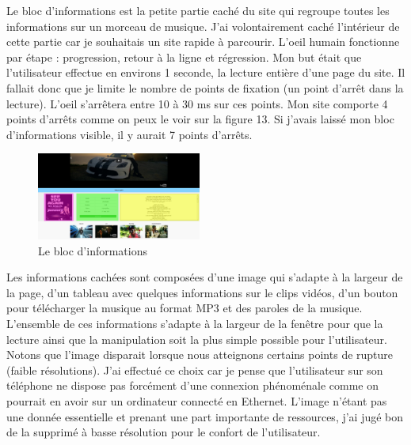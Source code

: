 \documentclass{article}
\begin{document}
Le bloc d'informations est la petite partie cach\'e du site qui regroupe toutes les informations sur un morceau de musique. J'ai volontairement cach\'e l'int\'erieur de cette partie car je souhaitais un site rapide \`a parcourir. L'oeil humain fonctionne par \'etape : progression, retour \`a la ligne et r\'egression. Mon but \'etait que l'utilisateur effectue en environs 1 seconde, la lecture enti\`ere d'une page du site. Il fallait donc que je limite le nombre de points de fixation (un point d'arr\^et dans la lecture). L'oeil s'arr\^etera entre 10 \`a 30 ms sur ces points. Mon site comporte 4 points d'arr\^ets comme on peux le voir sur la figure 13. Si j'avais laiss\'e mon bloc d'informations visible, il y aurait 7 points d'arr\^ets. \\

\begin{figure}
  \vspace{-25pt}
  \begin{center}
    \includegraphics[width=0.48\textwidth]{p5}
  \end{center}
  \vspace{-20pt}
  \caption{Le bloc d'informations}
  \vspace{-10pt}
\end{figure} 

Les informations cach\'ees sont compos\'ees d'une image qui s'adapte \`a la largeur de la page, d'un tableau avec quelques informations sur le clips vid\'eos, d'un bouton pour t\'el\'echarger la musique au format MP3 et des paroles de la musique. L'ensemble de ces informations s'adapte \`a la largeur de la fen\^etre pour que la lecture ainsi que la manipulation soit la plus simple possible pour l'utilisateur. Notons que l'image disparait lorsque nous atteignons certains points de rupture (faible r\'esolutions). J'ai effectu\'e ce choix car je pense que l'utilisateur sur son t\'el\'ephone ne dispose pas forc\'ement d'une connexion ph\'enom\'enale comme on pourrait en avoir sur un ordinateur connect\'e en Ethernet. L'image n'\'etant pas une donn\'ee essentielle et prenant une part importante de ressources, j'ai jug\'e bon de la supprim\'e \`a basse r\'esolution pour le confort de l'utilisateur.\\
\end{document}
